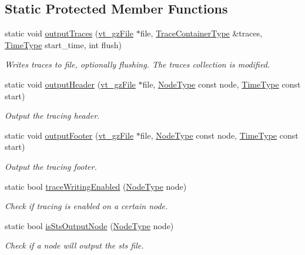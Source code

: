 \subsection*{Static Protected Member Functions}
\begin{DoxyCompactItemize}
\item 
static void \hyperlink{structvt_1_1trace_1_1_trace_lite_ad2b27c78a4fd520d1a066b0dda3637c4}{output\+Traces} (\hyperlink{structvt_1_1trace_1_1vt__gz_file}{vt\+\_\+gz\+File} $\ast$file, \hyperlink{structvt_1_1trace_1_1_trace_lite_a346a7751a544de425345a8983ed52146}{Trace\+Container\+Type} \&traces, \hyperlink{namespacevt_a2b9f28078dc309ad0706b69ded743e69}{Time\+Type} start\+\_\+time, int flush)
\begin{DoxyCompactList}\small\item\em Writes traces to file, optionally flushing. The traces collection is modified. \end{DoxyCompactList}\item 
static void \hyperlink{structvt_1_1trace_1_1_trace_lite_aaf8753f5726f118a862ac9e482889d61}{output\+Header} (\hyperlink{structvt_1_1trace_1_1vt__gz_file}{vt\+\_\+gz\+File} $\ast$file, \hyperlink{namespacevt_a866da9d0efc19c0a1ce79e9e492f47e2}{Node\+Type} const node, \hyperlink{namespacevt_a2b9f28078dc309ad0706b69ded743e69}{Time\+Type} const start)
\begin{DoxyCompactList}\small\item\em Output the tracing header. \end{DoxyCompactList}\item 
static void \hyperlink{structvt_1_1trace_1_1_trace_lite_a787596078778350020a4f601e91e793f}{output\+Footer} (\hyperlink{structvt_1_1trace_1_1vt__gz_file}{vt\+\_\+gz\+File} $\ast$file, \hyperlink{namespacevt_a866da9d0efc19c0a1ce79e9e492f47e2}{Node\+Type} const node, \hyperlink{namespacevt_a2b9f28078dc309ad0706b69ded743e69}{Time\+Type} const start)
\begin{DoxyCompactList}\small\item\em Output the tracing footer. \end{DoxyCompactList}\item 
static bool \hyperlink{structvt_1_1trace_1_1_trace_lite_aaf2192758f67bc57ab66766523bd96ad}{trace\+Writing\+Enabled} (\hyperlink{namespacevt_a866da9d0efc19c0a1ce79e9e492f47e2}{Node\+Type} node)
\begin{DoxyCompactList}\small\item\em Check if tracing is enabled on a certain node. \end{DoxyCompactList}\item 
static bool \hyperlink{structvt_1_1trace_1_1_trace_lite_acfad34ebd68c53547dcff4115dd54388}{is\+Sts\+Output\+Node} (\hyperlink{namespacevt_a866da9d0efc19c0a1ce79e9e492f47e2}{Node\+Type} node)
\begin{DoxyCompactList}\small\item\em Check if a node will output the sts file. \end{DoxyCompactList}\end{DoxyCompactItemize}
